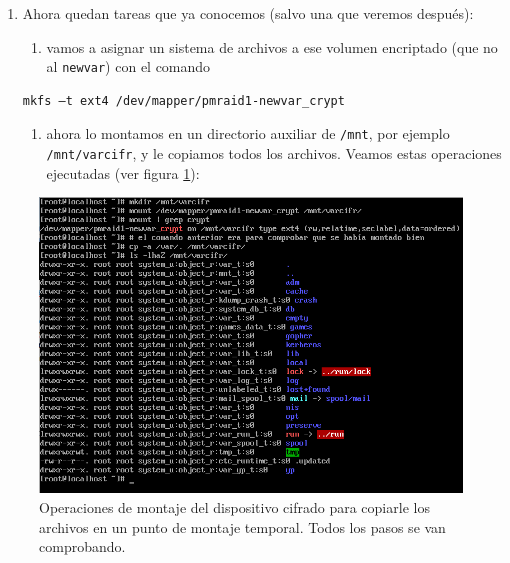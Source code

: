 \documentclass[
]{memoir}
\providecommand{\tightlist}{%
  \setlength{\itemsep}{0pt}\setlength{\parskip}{0pt}}
\begin{document}
\begin{enumerate}
\def\labelenumi{\arabic{enumi}.}
\setcounter{enumi}{10}
\item
  Ahora quedan tareas que ya conocemos (salvo una que veremos después):

  \begin{enumerate}
  \def\labelenumii{\alph{enumii}.}
  \tightlist
  \item
    vamos a asignar un sistema de archivos a ese volumen encriptado (que no al \texttt{newvar}) con el comando
  \end{enumerate}

\begin{verbatim}
mkfs –t ext4 /dev/mapper/pmraid1-newvar_crypt
\end{verbatim}

  \begin{enumerate}
  \def\labelenumii{\alph{enumii}.}
  \setcounter{enumii}{1}
  \tightlist
  \item
    ahora lo montamos en un directorio auxiliar de \texttt{/mnt}, por ejemplo \texttt{/mnt/varcifr}, y le copiamos todos los archivos. Veamos estas operaciones ejecutadas (ver figura \ref{fig:10h}):
  \end{enumerate}
\end{enumerate}

\begin{figure}

{\centering \includegraphics[width=0.95\linewidth]{images/10} 

}

\caption{Operaciones de montaje del dispositivo cifrado para copiarle los archivos en un punto de montaje temporal. Todos los pasos se van comprobando.}\label{fig:10h}
\end{figure}
\end{document}
